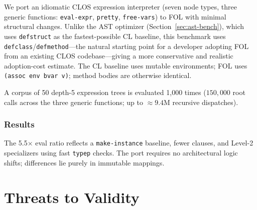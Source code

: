 \documentclass[sigconf,nonacm]{acmart}
\begin{document}
We port an idiomatic CLOS expression interpreter (seven node types, three generic functions: \texttt{eval-expr}, \texttt{pretty}, \texttt{free-vars}) to FOL with minimal structural changes.
Unlike the AST optimizer (Section~\ref{sec:ast-bench}), which uses \texttt{defstruct} as the fastest-possible CL baseline, this benchmark uses
\texttt{defclass}/\texttt{defmethod}---the natural starting point for a developer adopting FOL from an existing CLOS codebase---giving a more conservative and realistic adoption-cost estimate.
The CL baseline uses mutable environments; FOL uses \texttt{(assoc env bvar v)}; method bodies are otherwise identical.

A corpus of 50 depth-5 expression trees is evaluated 1,000 times ($150{,}000$ root calls across the three generic functions; up to ${\approx}9.4$M recursive dispatches).

\subsubsection*{Results}

The 5.5$\times$ eval ratio reflects a \texttt{make-instance} baseline, fewer clauses, and Level-2 specializers using fast \texttt{typep} checks.
The port requires no architectural logic shifts; differences lie purely in immutable mappings.

\section{Threats to Validity}
\label{sec:threats}
\end{document}
